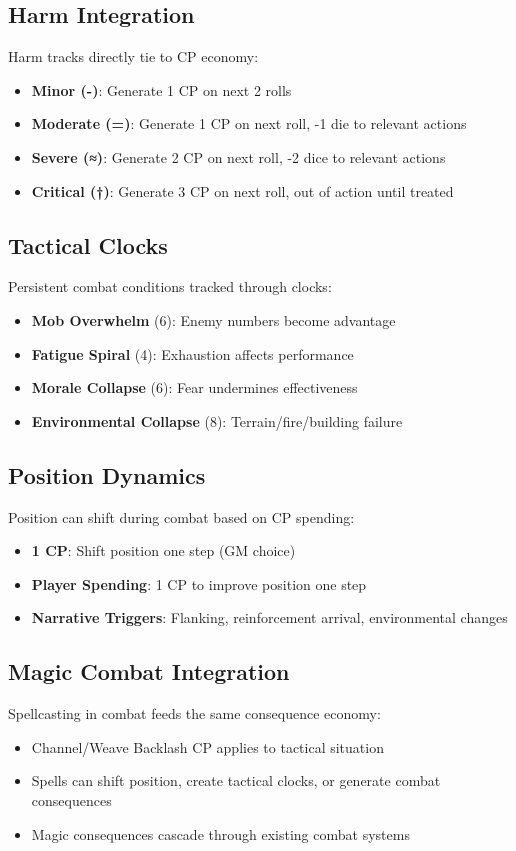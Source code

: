 \documentclass[11pt]{article}
\begin{document}
\subsection{Harm Integration}
Harm tracks directly tie to CP economy:
\begin{itemize}
    \item \textbf{Minor (-)}: Generate 1 CP on next 2 rolls
    \item \textbf{Moderate (=)}: Generate 1 CP on next roll, -1 die to relevant actions
    \item \textbf{Severe (≈)}: Generate 2 CP on next roll, -2 dice to relevant actions  
    \item \textbf{Critical (†)}: Generate 3 CP on next roll, out of action until treated
\end{itemize}

\subsection{Tactical Clocks}
Persistent combat conditions tracked through clocks:
\begin{itemize}
    \item \textbf{Mob Overwhelm} (6): Enemy numbers become advantage
    \item \textbf{Fatigue Spiral} (4): Exhaustion affects performance
    \item \textbf{Morale Collapse} (6): Fear undermines effectiveness
    \item \textbf{Environmental Collapse} (8): Terrain/fire/building failure
\end{itemize}

\subsection{Position Dynamics}
Position can shift during combat based on CP spending:
\begin{itemize}
    \item \textbf{1 CP}: Shift position one step (GM choice)
    \item \textbf{Player Spending}: 1 CP to improve position one step
    \item \textbf{Narrative Triggers}: Flanking, reinforcement arrival, environmental changes
\end{itemize}

\subsection{Magic Combat Integration}
Spellcasting in combat feeds the same consequence economy:
\begin{itemize}
    \item Channel/Weave Backlash CP applies to tactical situation
    \item Spells can shift position, create tactical clocks, or generate combat consequences
    \item Magic consequences cascade through existing combat systems
\end{itemize}
\end{document}
